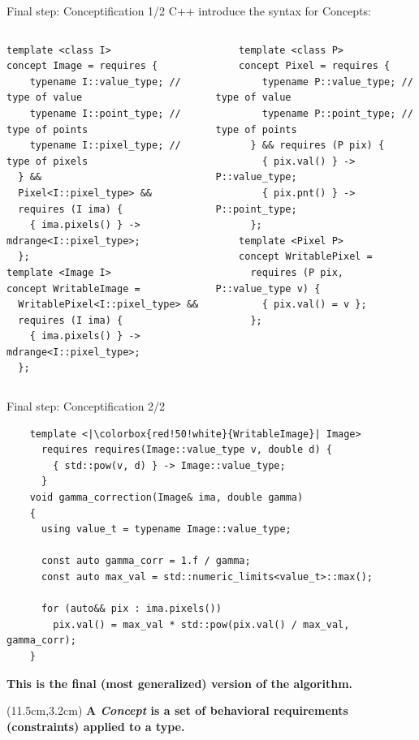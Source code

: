 \documentclass[12pt,aspectratio=169]{beamer}
\begin{document}

\begin{frame}[fragile]{Final step: Conceptification 1/2}
  C++ introduce the syntax for Concepts:
  \begin{columns}[T,onlytextwidth]
    \begin{verbatim}
template <class I>
concept Image = requires {
    typename I::value_type; // type of value
    typename I::point_type; // type of points
    typename I::pixel_type; // type of pixels
  } &&
  Pixel<I::pixel_type> &&
  requires (I ima) {
    { ima.pixels() } -> mdrange<I::pixel_type>;
  };
template <Image I>
concept WritableImage = 
  WritablePixel<I::pixel_type> &&
  requires (I ima) {
    { ima.pixels() } -> mdrange<I::pixel_type>;
  };
  \end{verbatim}

    \begin{verbatim}
    template <class P>
    concept Pixel = requires {
        typename P::value_type; // type of value
        typename P::point_type; // type of points
      } && requires (P pix) {
        { pix.val() } -> P::value_type;
        { pix.pnt() } -> P::point_type;
      };
    template <Pixel P>
    concept WritablePixel = 
      requires (P pix, P::value_type v) {
        { pix.val() = v };
      };
  \end{verbatim}
  \end{columns}
\end{frame}

\begin{frame}[fragile]{Final step: Conceptification 2/2}
  \begin{verbatim}
    template <|\colorbox{red!50!white}{WritableImage}| Image>
      requires requires(Image::value_type v, double d) {
        { std::pow(v, d) } -> Image::value_type;
      }
    void gamma_correction(Image& ima, double gamma)
    {
      using value_t = typename Image::value_type;
    
      const auto gamma_corr = 1.f / gamma;
      const auto max_val = std::numeric_limits<value_t>::max();
    
      for (auto&& pix : ima.pixels())
        pix.val() = max_val * std::pow(pix.val() / max_val, gamma_corr);
    }
  \end{verbatim}
  \vfill
  \begin{center}\textbf{This is the final (most generalized) version of the algorithm.}\end{center}
  \begin{textblock*}{4cm}(11.5cm,3.2cm)
    \textbf{A \emph{Concept} is a set of behavioral requirements (constraints) applied to a type.}
  \end{textblock*}
\end{frame}
\end{document}
